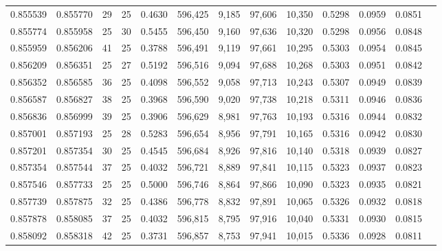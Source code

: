 \begin{tabular}{rrrrrrrrrrrrr}
0.855539 & 0.855770 &    29 &  25 &                                     0.4630 & 596,425 &   9,185 &  97,606 &  10,350 & 0.5298 & 0.0959 & 0.0851 \\
0.855774 & 0.855958 &    25 &  30 &                                     0.5455 & 596,450 &   9,160 &  97,636 &  10,320 & 0.5298 & 0.0956 & 0.0848 \\
0.855959 & 0.856206 &    41 &  25 &                                     0.3788 & 596,491 &   9,119 &  97,661 &  10,295 & 0.5303 & 0.0954 & 0.0845 \\
0.856209 & 0.856351 &    25 &  27 &                                     0.5192 & 596,516 &   9,094 &  97,688 &  10,268 & 0.5303 & 0.0951 & 0.0842 \\
0.856352 & 0.856585 &    36 &  25 &                                     0.4098 & 596,552 &   9,058 &  97,713 &  10,243 & 0.5307 & 0.0949 & 0.0839 \\
0.856587 & 0.856827 &    38 &  25 &                                     0.3968 & 596,590 &   9,020 &  97,738 &  10,218 & 0.5311 & 0.0946 & 0.0836 \\
0.856836 & 0.856999 &    39 &  25 &                                     0.3906 & 596,629 &   8,981 &  97,763 &  10,193 & 0.5316 & 0.0944 & 0.0832 \\
0.857001 & 0.857193 &    25 &  28 &                                     0.5283 & 596,654 &   8,956 &  97,791 &  10,165 & 0.5316 & 0.0942 & 0.0830 \\
0.857201 & 0.857354 &    30 &  25 &                                     0.4545 & 596,684 &   8,926 &  97,816 &  10,140 & 0.5318 & 0.0939 & 0.0827 \\
0.857354 & 0.857544 &    37 &  25 &                                     0.4032 & 596,721 &   8,889 &  97,841 &  10,115 & 0.5323 & 0.0937 & 0.0823 \\
0.857546 & 0.857733 &    25 &  25 &                                     0.5000 & 596,746 &   8,864 &  97,866 &  10,090 & 0.5323 & 0.0935 & 0.0821 \\
0.857739 & 0.857875 &    32 &  25 &                                     0.4386 & 596,778 &   8,832 &  97,891 &  10,065 & 0.5326 & 0.0932 & 0.0818 \\
0.857878 & 0.858085 &    37 &  25 &                                     0.4032 & 596,815 &   8,795 &  97,916 &  10,040 & 0.5331 & 0.0930 & 0.0815 \\
0.858092 & 0.858318 &    42 &  25 &                                     0.3731 & 596,857 &   8,753 &  97,941 &  10,015 & 0.5336 & 0.0928 & 0.0811 \\

\end{tabular}
